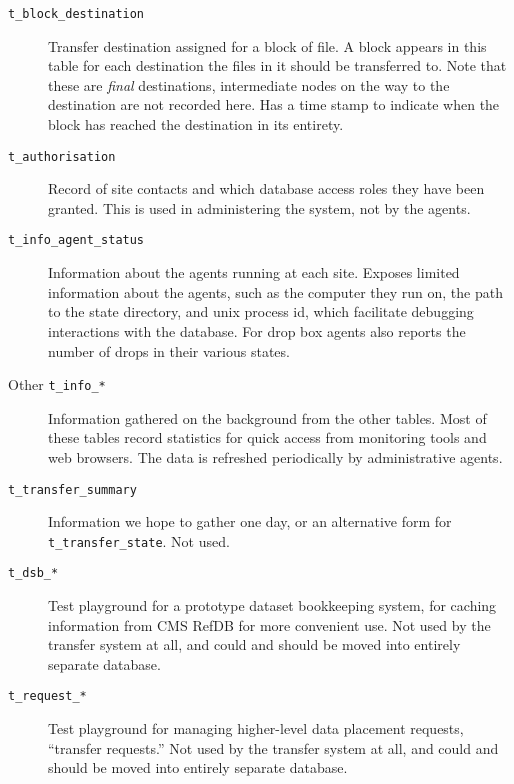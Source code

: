 \documentclass{cmspaper}
\begin{document}
\begin{description}
  \item [\texttt{t\_block\_destination}]\mbox{}

    Transfer destination assigned for a block of file.  A block
    appears in this table for each destination the files in it
    should be transferred to.  Note that these are {\em final}
    destinations, intermediate nodes on the way to the
    destination are not recorded here.  Has a time stamp to
    indicate when the block has reached the destination in its
    entirety.

  \item [\texttt{t\_authorisation}]\mbox{}

    Record of site contacts and which database access roles they
    have been granted.  This is used in administering the system,
    not by the agents.
    
  \item [\texttt{t\_info\_agent\_status}]\mbox{}

    Information about the agents running at each site.  Exposes
    limited information about the agents, such as the computer
    they run on, the path to the state directory, and unix process
    id, which facilitate debugging interactions with the database.
    For drop box agents also reports the number of drops in their
    various states.

  \item [Other \texttt{t\_info\_*}]\mbox{}

    Information gathered on the background from the other tables.
    Most of these tables record statistics for quick access from
    monitoring tools and web browsers.  The data is refreshed
    periodically by administrative agents.

  \item [\texttt{t\_transfer\_summary}]\mbox{}
  
    Information we hope to gather one day, or an alternative form
    for \texttt{t\_transfer\_state}.  Not used.

  \item [\texttt{t\_dsb\_*}]\mbox{}
  
    Test playground for a prototype dataset bookkeeping system,
    for caching information from CMS RefDB for more convenient
    use.  Not used by the transfer system at all, and could and
    should be moved into entirely separate database.

  \item [\texttt{t\_request\_*}]\mbox{}
  
    Test playground for managing higher-level data placement
    requests, ``transfer requests.''  Not used by the transfer
    system at all, and could and should be moved into entirely
    separate database.

\end{description}
\end{document}
